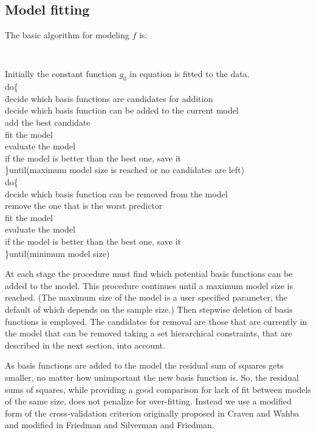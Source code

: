 \subsection*{Model fitting}
The basic algorithm for modeling $f$ is:

{\tt
\begin{tabbing}
Initially the constant function $g_0$ in equation is fitted to the data.\\
do\{\\
\hspace*{.5cm}\=decide which basis functions are candidates for addition\\
 \>decide which basis function can be added to the current model\\
 \>add the best candidate\\
 \>fit the model\\
 \>evaluate the model\\
 \>if the model is better than the best one, save it\\
\hspace*{.2cm} \}until(maximum model size is reached or no candidates
are left)\\
do\{\\
\>decide which basis function can be removed from the model\\
 \>remove the one that is the worst predictor\\
 \>fit the model\\
 \>evaluate the model\\
 \>if the model is better than the best one, save it\\
 \hspace*{.2cm}  \}until(minimum model size)\\
\end{tabbing}}

At each stage the
procedure must 
find which potential basis functions can be
added to the model. This procedure continues until a maximum model
size is reached.
(The maximum size of the model is a user specified
parameter, the default of which depends on the sample size.)
Then stepwise deletion of basis functions is employed.
The candidates for removal are those that are currently in the model
that can be 
removed taking a set hierarchical constraints, that are described in
the next section, into account.
 
As basis functions are added to the model the residual sum of
squares gets smaller, no matter how
unimportant the new basis function is. So,
the residual sums of squares, while providing a good
comparison for lack of fit between 
models of the same size, does not penalize for over-fitting. Instead we use
a modified form of the cross-validation criterion originally proposed in
Craven and Wahba\cite{C} 
and modified in Friedman and Silverman\cite{D} and Friedman\cite{E}.

